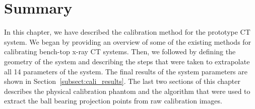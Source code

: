 \section{Summary}
In this chapter, we have described the calibration method for the prototype CT system.  We began by providing an overview of some of the existing methods for calibrating bench-top x-ray CT systems.  Then, we followed by defining the geometry of the system and describing the steps that were taken to extrapolate all 14 parameters of the system.  The final results of the system parameters are shown in Section~\ref{subsect:cali_results}.  The last two sections of this chapter describes the physical calibration phantom and the algorithm that were used to extract the ball bearing projection points from raw calibration images.  


%
